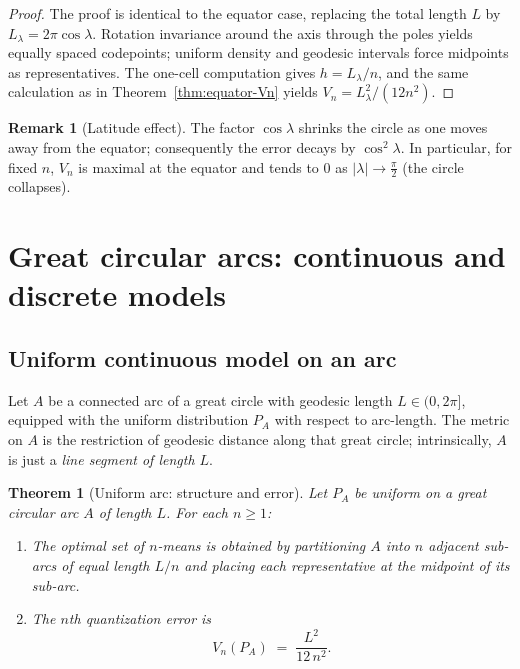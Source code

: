 \documentclass[12pt, reqno]{amsart}
\theoremstyle{plain}
\newtheorem{theorem1}[subsubsection]{Theorem}
\theoremstyle{definition}
\newtheorem{remark1}[subsubsection]{Remark}
\begin{document}
\begin{proof}
The proof is identical to the equator case, replacing the total length $L$ by $L_\lambda=2\pi\cos\lambda$. Rotation invariance around the axis through the poles yields equally spaced codepoints; uniform density and geodesic intervals force midpoints as representatives. The one-cell computation gives $h=L_\lambda/n$, and the same calculation as in Theorem~\ref{thm:equator-Vn} yields $V_n=L_\lambda^2/(12n^2)$.
\end{proof}

\begin{remark1}[Latitude effect]
The factor $\cos\lambda$ shrinks the circle as one moves away from the equator; consequently the error decays by $\cos^2\lambda$. In particular, for fixed $n$, $V_n$ is maximal at the equator and tends to $0$ as $|\lambda|\to \frac{\pi}{2}$ (the circle collapses).
\end{remark1}


\section{Great circular arcs: continuous and discrete models}

\subsection{Uniform continuous model on an arc}
Let $A$ be a connected arc of a great circle with geodesic length $L\in(0,2\pi]$, equipped with the uniform distribution $P_A$ with respect to arc-length. The metric on $A$ is the restriction of geodesic distance along that great circle; intrinsically, $A$ is just a \emph{line segment of length $L$}.

\begin{theorem1}[Uniform arc: structure and error]\label{thm:arc-continuous}
Let $P_A$ be uniform on a great circular arc $A$ of length $L$. For each $n\ge 1$:
\begin{enumerate}[label=(\roman*), leftmargin=1.5em]
  \item The optimal set of $n$-means is obtained by partitioning $A$ into $n$ adjacent sub-arcs of equal length $L/n$ and placing each representative at the midpoint of its sub-arc.
  \item The $n$th quantization error is
  \[
  V_n(P_A)\;=\;\frac{L^2}{12\,n^2}.
  \]
\end{enumerate}
\end{theorem1}
\end{document}
